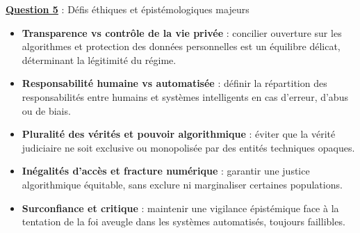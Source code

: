 \documentclass[12pt, a4paper]{article}
\newcommand{\question}[1]{\textbf{\underline{Question #1}}}
\begin{document}
\begin{enumerate}[label=\textbf{\arabic*.}, start=6]
		\question{5} : Défis éthiques et épistémologiques majeurs
		
		\begin{itemize}
			\item \textbf{Transparence vs contrôle de la vie privée} : concilier ouverture sur les algorithmes et protection des données personnelles est un équilibre délicat, déterminant la légitimité du régime.
			\item \textbf{Responsabilité humaine vs automatisée} : définir la répartition des responsabilités entre humains et systèmes intelligents en cas d'erreur, d'abus ou de biais.
			\item \textbf{Pluralité des vérités et pouvoir algorithmique} : éviter que la vérité judiciaire ne soit exclusive ou monopolisée par des entités techniques opaques.
			\item \textbf{Inégalités d'accès et fracture numérique} : garantir une justice algorithmique équitable, sans exclure ni marginaliser certaines populations.
			\item \textbf{Surconfiance et critique} : maintenir une vigilance épistémique face à la tentation de la foi aveugle dans les systèmes automatisés, toujours faillibles.
		\end{itemize}
	\end{enumerate}
	
	
\end{document}
